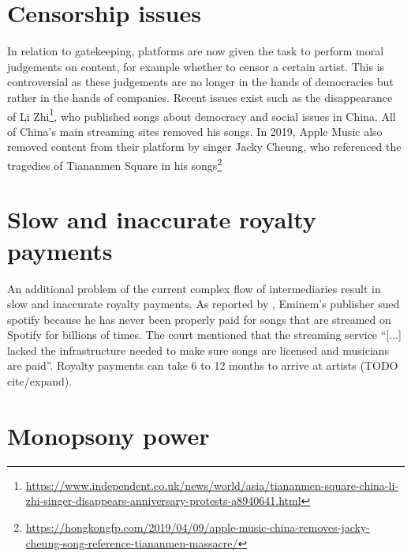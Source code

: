 \section{Censorship issues}
\label{sec:problem-description-censoring}
In relation to gatekeeping, platforms are now given the task to perform moral judgements on content, for example whether to censor a certain artist. This is controversial as these judgements are no longer in the hands of democracies but rather in the hands of companies. Recent issues exist such as the disappearance of Li Zhi\footnote{\url{https://www.independent.co.uk/news/world/asia/tiananmen-square-china-li-zhi-singer-disappears-anniversary-protests-a8940641.html}}, who published songs about democracy and social issues in China. All of China's main streaming sites removed his songs. In 2019, Apple Music also removed content from their platform by singer Jacky Cheung, who referenced the tragedies of Tiananmen Square in his songs\footnote{\url{https://hongkongfp.com/2019/04/09/apple-music-china-removes-jacky-cheung-song-reference-tiananmen-massacre/}}

\section{Slow and inaccurate royalty payments}
An additional problem of the current complex flow of intermediaries result in slow and inaccurate royalty payments. As reported by \cite{bbc2019}, Eminem's publisher sued spotify because he has never been properly paid for songs that are streamed on Spotify for billions of times. The court mentioned that the streaming service ``[...] lacked the infrastructure needed to make sure songs are licensed and musicians are paid''. Royalty payments can take 6 to 12 months to arrive at artists (TODO cite/expand). 

\section{Monopsony power}

